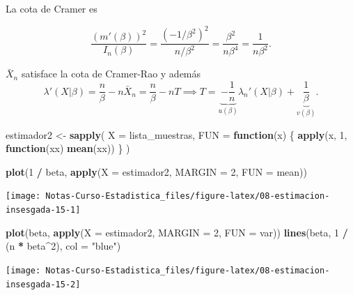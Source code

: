 \documentclass[
  12pt,
]{book}
\newenvironment{Shaded}{\begin{snugshade}}{\end{snugshade}}
\newcommand{\ControlFlowTok}[1]{\textcolor[rgb]{0.13,0.29,0.53}{\textbf{#1}}}
\newcommand{\DataTypeTok}[1]{\textcolor[rgb]{0.13,0.29,0.53}{#1}}
\newcommand{\DecValTok}[1]{\textcolor[rgb]{0.00,0.00,0.81}{#1}}
\newcommand{\KeywordTok}[1]{\textcolor[rgb]{0.13,0.29,0.53}{\textbf{#1}}}
\newcommand{\NormalTok}[1]{#1}
\newcommand{\OperatorTok}[1]{\textcolor[rgb]{0.81,0.36,0.00}{\textbf{#1}}}
\newcommand{\StringTok}[1]{\textcolor[rgb]{0.31,0.60,0.02}{#1}}
\begin{document}
La cota de Cramer es

\[\dfrac{(m'(\beta))^2}{I_n(\beta)} = \dfrac{(-1/\beta^2)^2}{n/\beta^2} = \dfrac{\beta^2}{n\beta^4} = \dfrac{1}{n\beta^2}.\]

\(\bar X_n\) satisface la cota de Cramer-Rao y además
\[\lambda'(X|\beta) = \dfrac n\beta - n\bar X_n =\dfrac n\beta - nT \implies T = \underbrace{-\dfrac 1n}_{u(\beta)}\lambda_n'(X|\beta)+ \underbrace{\dfrac 1\beta}_{v(\beta)}. \]

\begin{Shaded}
\begin{Highlighting}[]
\NormalTok{estimador2 \textless{}{-}}\StringTok{ }\KeywordTok{sapply}\NormalTok{(}
  \DataTypeTok{X =}\NormalTok{ lista\_muestras,}
  \DataTypeTok{FUN =} \ControlFlowTok{function}\NormalTok{(x) \{}
    \KeywordTok{apply}\NormalTok{(x, }\DecValTok{1}\NormalTok{, }\ControlFlowTok{function}\NormalTok{(xx) }\KeywordTok{mean}\NormalTok{(xx))}
\NormalTok{  \}}
\NormalTok{)}

\KeywordTok{plot}\NormalTok{(}\DecValTok{1} \OperatorTok{/}\StringTok{ }\NormalTok{beta, }\KeywordTok{apply}\NormalTok{(}\DataTypeTok{X =}\NormalTok{ estimador2, }\DataTypeTok{MARGIN =} \DecValTok{2}\NormalTok{, }\DataTypeTok{FUN =}\NormalTok{ mean))}
\end{Highlighting}
\end{Shaded}

\begin{center}\texttt{[image: Notas-Curso-Estadistica\_files/figure-latex/08-estimacion-insesgada-15-1]} \end{center}

\begin{Shaded}
\begin{Highlighting}[]
\KeywordTok{plot}\NormalTok{(beta, }\KeywordTok{apply}\NormalTok{(}\DataTypeTok{X =}\NormalTok{ estimador2, }\DataTypeTok{MARGIN =} \DecValTok{2}\NormalTok{, }\DataTypeTok{FUN =}\NormalTok{ var))}
\KeywordTok{lines}\NormalTok{(beta, }\DecValTok{1} \OperatorTok{/}\StringTok{ }\NormalTok{(n }\OperatorTok{*}\StringTok{ }\NormalTok{beta}\OperatorTok{\^{}}\DecValTok{2}\NormalTok{), }\DataTypeTok{col =} \StringTok{"blue"}\NormalTok{)}
\end{Highlighting}
\end{Shaded}

\begin{center}\texttt{[image: Notas-Curso-Estadistica\_files/figure-latex/08-estimacion-insesgada-15-2]} \end{center}
\end{document}
